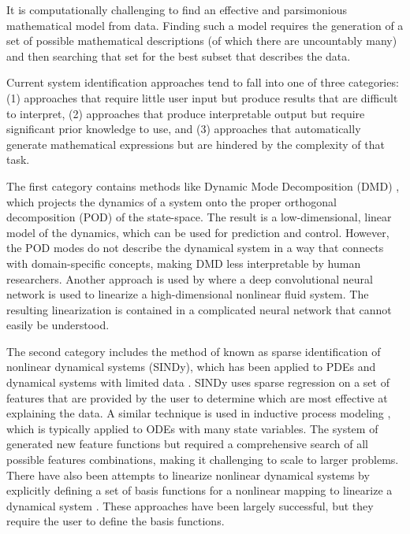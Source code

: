 \documentclass{article}
\begin{document}
It is computationally challenging to find an effective and parsimonious mathematical model from data. Finding such a model requires the generation of a set of possible mathematical descriptions (of which there are uncountably many) and then searching that set for the best subset that describes the data.
 
Current system identification approaches tend to fall into one of three categories: (1) approaches that require little user input but produce results that are difficult to interpret, (2) approaches that produce interpretable output but require significant prior knowledge to use, and (3) approaches that automatically generate mathematical expressions but are hindered by the complexity of that task.

The first category contains methods like Dynamic Mode Decomposition (DMD) \cite{schmid2010dynamic, kutz2016dynamic}, which projects the dynamics of a system onto the proper orthogonal decomposition (POD) of the state-space. The result is a low-dimensional, linear model of the dynamics, which can be used for prediction and control. However, the POD modes do not describe the dynamical system in a way that connects with domain-specific concepts, making DMD less interpretable by human researchers. Another approach is used by \citet{morton2018deep} where a deep convolutional neural network is used to linearize a high-dimensional nonlinear fluid system. The resulting linearization is contained in a complicated neural network that cannot easily be understood.

The second category includes the method of \citet{brunton2016discovering} known as sparse identification of nonlinear dynamical systems (SINDy), which has been applied to PDEs \cite{rudy2017data} and dynamical systems with limited data \cite{kaiser2018sparse}. SINDy uses sparse regression on a set of features that are provided by the user to determine which are most effective at explaining the data. A similar technique is used in inductive process modeling \cite{bridewell2008inductive, langley2015heuristic}, which is typically applied to ODEs with many state variables. The system of \citet{krizman1995discovering} generated new feature functions but required a comprehensive search of all possible features combinations, making it challenging to scale to larger problems. There have also been attempts to linearize nonlinear dynamical systems by explicitly defining a set of basis functions for a nonlinear mapping to linearize a dynamical system \cite{williams2015data, johnson2018class}. These approaches have been largely successful, but they require the user to define the basis functions. 
\end{document}
